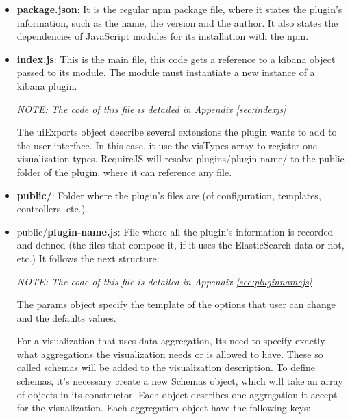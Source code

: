 \documentclass[a4paper, 12pt]{book}
\begin{document}
\begin{itemize}
\item \textbf{package.json}:  It is the regular npm package file, where it states the plugin’s information, such as the name, the version and the author. It also states the dependencies of JavaScript modules for its installation with the npm.
\item \textbf{index.js}: This is the main file, this code gets a reference to a kibana object passed to its module. The module must instantiate a new instance of a kibana plugin.

\begin{center}
\textit{NOTE: The code of this file is detailed in Appendix \ref{sec:indexjs}}
\end{center}

The uiExports object describe several extensions the plugin wants to add to the user interface. In this case, it use the visTypes array to register one visualization types. RequireJS will resolve plugins/plugin-name/ to the public folder of the plugin, where it can reference any file. 
 
\item \textbf{public/}: Folder where the plugin’s files are (of configuration, templates, controllers, etc.).
\item public/\textbf{plugin-name.js}: File where all the plugin’s information is recorded and defined (the files that compose it, if it uses the ElasticSearch data or not, etc.) It follows the next structure:

\begin{center}
\textit{NOTE: The code of this file is detailed in Appendix \ref{sec:pluginnamejs}}
\end{center}

The params object specify the template of the options that user can change and the defaults values.

For a visualization that uses data aggregation, Its need to specify exactly what aggregations the visualization needs or is allowed to have. These so called schemas will be added to the visualization description. To define schemas, it's necessary create a new Schemas object, which will take an array of objects in its constructor. Each object describes one aggregation it accept for the visualization. Each aggregation object have the following keys:


\end{itemize}
\end{document}
